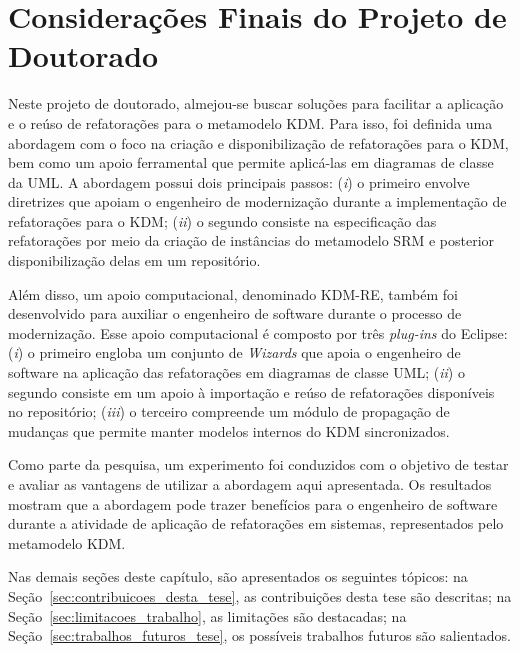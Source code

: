 \section{Considerações Finais do Projeto de Doutorado}
Neste projeto de doutorado, almejou-se buscar soluções para facilitar a aplicação e o reúso de refatorações para o metamodelo KDM. Para isso, foi definida uma abordagem com o foco na criação e disponibilização de refatorações para o KDM, bem como um apoio ferramental que permite aplicá-las em diagramas de classe da UML. A abordagem possui dois principais passos: (\textit{i}) o primeiro envolve diretrizes que apoiam o engenheiro de modernização durante a implementação de refatorações para o KDM; (\textit{ii}) o segundo consiste na especificação das refatorações por meio da criação de instâncias do metamodelo SRM e posterior disponibilização delas em um repositório.

Além disso, um apoio computacional, denominado KDM-RE, também foi desenvolvido para auxiliar o engenheiro de software durante o processo de modernização. Esse apoio computacional é composto por três \textit{plug-ins} do Eclipse: (\textit{i}) o primeiro engloba um conjunto de \textit{Wizards} que apoia o engenheiro de software na aplicação das refatorações em diagramas de classe UML; (\textit{ii}) o segundo consiste em um apoio à importação e reúso de refatorações disponíveis no repositório; (\textit{iii}) o terceiro compreende um módulo de propagação de mudanças que permite manter modelos internos do KDM sincronizados.

Como parte da pesquisa, um experimento foi conduzidos com o objetivo de testar e avaliar as vantagens de utilizar a abordagem aqui apresentada. Os resultados mostram que a abordagem pode trazer benefícios para o engenheiro de software durante a atividade de aplicação de refatorações em sistemas, representados pelo metamodelo KDM.


Nas demais seções deste capítulo, são apresentados os seguintes tópicos: na Seção~\ref{sec:contribuicoes_desta_tese}, as contribuições desta tese são descritas; na Seção~\ref{sec:limitacoes_trabalho}, as limitações são destacadas; na Seção~\ref{sec:trabalhos_futuros_tese}, os possíveis trabalhos futuros são salientados.%

